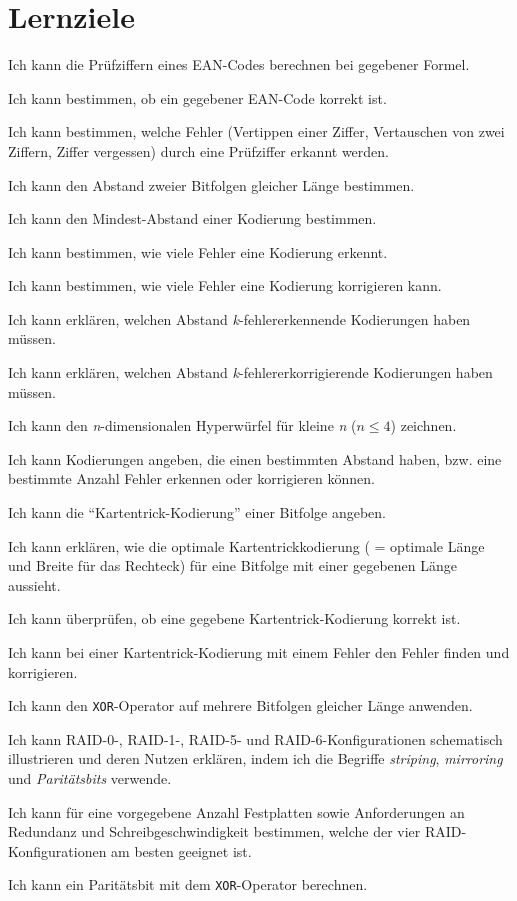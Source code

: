 \chapter{Lernziele}
\begin{todolist}
    \item Ich kann die Prüfziffern eines EAN-Codes berechnen bei gegebener Formel.
    \item Ich kann bestimmen, ob ein gegebener EAN-Code korrekt ist.
    \item Ich kann bestimmen, welche Fehler (Vertippen einer Ziffer, Vertauschen von zwei Ziffern, Ziffer vergessen) durch eine Prüfziffer erkannt werden.
    \item Ich kann den Abstand zweier Bitfolgen gleicher Länge bestimmen.
    \item Ich kann den Mindest-Abstand einer Kodierung bestimmen.
    \item Ich kann bestimmen, wie viele Fehler eine Kodierung erkennt.
    \item Ich kann bestimmen, wie viele Fehler eine Kodierung korrigieren kann.
    \item Ich kann erklären, welchen Abstand \textit{k}-fehlererkennende Kodierungen haben müssen.
    \item Ich kann erklären, welchen Abstand \textit{k}-fehlererkorrigierende Kodierungen haben müssen.
    \item Ich kann den \textit{n}-dimensionalen Hyperwürfel für kleine \textit{n} ($n\leq 4$) zeichnen.
    \item Ich kann Kodierungen angeben, die einen bestimmten Abstand haben, bzw. eine bestimmte Anzahl Fehler erkennen oder korrigieren können.
    \item Ich kann die ``Kartentrick-Kodierung'' einer Bitfolge angeben.
    \item Ich kann erklären, wie die optimale Kartentrickkodierung ( = optimale Länge und Breite für das Rechteck) für eine Bitfolge mit einer gegebenen Länge aussieht.
    \item Ich kann überprüfen, ob eine gegebene Kartentrick-Kodierung korrekt ist.
    \item Ich kann bei einer Kartentrick-Kodierung mit einem Fehler den Fehler finden und korrigieren.
    \item Ich kann den \texttt{XOR}-Operator auf mehrere Bitfolgen gleicher Länge anwenden.
    \item Ich kann RAID-0-, RAID-1-, RAID-5- und RAID-6-Konfigurationen schematisch illustrieren und deren Nutzen erklären, indem ich die Begriffe \textit{striping}, \textit{mirroring} und \textit{Paritätsbits} verwende.
    \item Ich kann für eine vorgegebene Anzahl Festplatten sowie Anforderungen an Redundanz und Schreibgeschwindigkeit bestimmen, welche der vier RAID-Konfigurationen am besten geeignet ist.
    \item Ich kann ein Paritätsbit mit dem \texttt{XOR}-Operator berechnen.
\end{todolist}
